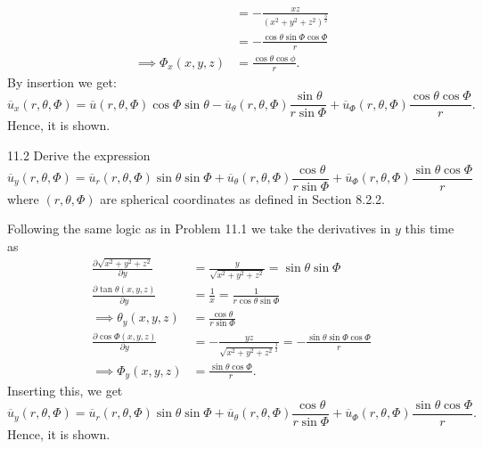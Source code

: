 \begin{derivation}
\begin{align*}
       &= - \frac{xz}{\left( x^2 + y^2 + z^2 \right)^{\frac{3}{2}}} \\
       &= - \frac{\cos \theta \sin \Phi \cos \Phi}{r} \\
       \implies \Phi_x(x,y,z) &= \frac{\cos \theta \cos \phi}{r}
  .\end{align*}
  By insertion we get:
  \begin{equation*}
    \overline{u}_x(r, \theta, \Phi) = \overline{u}(r, \theta, \Phi) \cos \Phi \sin \theta - \overline{u}_{\theta} (r, \theta, \Phi) \frac{\sin \theta}{r \sin \Phi} + \overline{u}_{\Phi} (r, \theta, \Phi) \frac{\cos \theta \cos \Phi}{r}
  .\end{equation*}
  Hence, it is shown.
\end{derivation}

\newpage

\begin{problem}{11.2}
  Derive the expression
  \begin{equation*}
    \overline{u}_y (r, \theta, \Phi) = \overline{u}_r (r, \theta, \Phi) \sin \theta \sin \Phi + \overline{u}_{\theta} (r, \theta, \Phi) \frac{\cos \theta}{r \sin \Phi} + \overline{u}_{\Phi}(r, \theta, \Phi) \frac{\sin \theta \cos \Phi}{r}
  \end{equation*}
  where $(r, \theta, \Phi)$ are spherical coordinates as defined in Section 8.2.2.
\end{problem}

\begin{derivation}
  Following the same logic as in Problem 11.1 we take the derivatives in $y$ this time as
  \begin{align*}
    \frac{\partial \sqrt{x^2 + y^2 + z^2}}{\partial y} &= \frac{y}{\sqrt{x^2 + y^2 + z^2}} = \sin \theta \sin \Phi \\
    \frac{\partial \tan \theta(x,y,z)}{\partial y} &= \frac{1}{x} = \frac{1}{r \cos \theta \sin \Phi} \\
    \implies \theta_y(x,y,z) &= \frac{\cos \theta}{r \sin \Phi} \\
    \frac{\partial \cos \Phi(x,y,z)}{\partial y} &= - \frac{yz}{\sqrt{x^2 + y^2 + z^2}^{\frac{3}{2}}} = - \frac{\sin \theta \sin \Phi \cos \Phi}{r}\\
    \implies \Phi_y(x,y,z) &= \frac{\sin \theta \cos \Phi}{r}
  .\end{align*}
  Inserting this, we get
  \begin{equation*}
    \overline{u}_y(r, \theta, \Phi) = \overline{u}_r(r, \theta, \Phi) \sin \theta \sin \Phi + \overline{u}_{\theta}(r, \theta, \Phi) \frac{\cos \theta}{r \sin \Phi} + \overline{u}_{\Phi}(r, \theta, \Phi) \frac{\sin \theta \cos \Phi}{r}
  .\end{equation*}
  Hence, it is shown.
\end{derivation}

